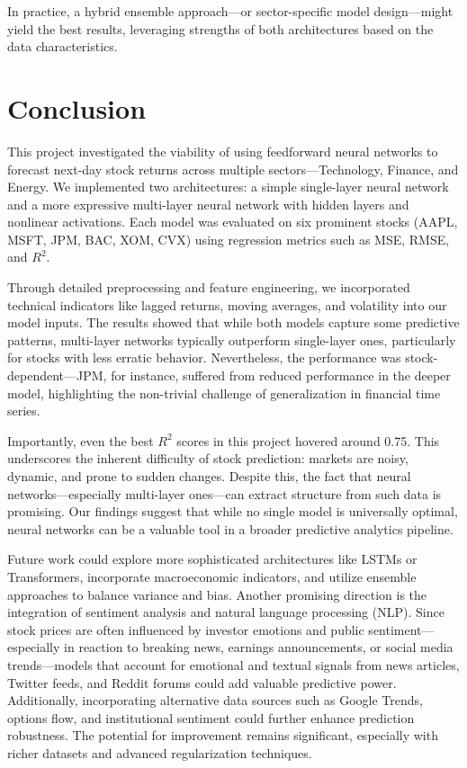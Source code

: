 \documentclass[12pt]{article}
\begin{document}
In practice, a hybrid ensemble approach—or sector-specific model design—might yield the best results, leveraging strengths of both architectures based on the data characteristics.

\section{Conclusion}

This project investigated the viability of using feedforward neural networks to forecast next-day stock returns across multiple sectors—Technology, Finance, and Energy. We implemented two architectures: a simple single-layer neural network and a more expressive multi-layer neural network with hidden layers and nonlinear activations. Each model was evaluated on six prominent stocks (AAPL, MSFT, JPM, BAC, XOM, CVX) using regression metrics such as MSE, RMSE, and $R^2$.

Through detailed preprocessing and feature engineering, we incorporated technical indicators like lagged returns, moving averages, and volatility into our model inputs. The results showed that while both models capture some predictive patterns, multi-layer networks typically outperform single-layer ones, particularly for stocks with less erratic behavior. Nevertheless, the performance was stock-dependent—JPM, for instance, suffered from reduced performance in the deeper model, highlighting the non-trivial challenge of generalization in financial time series.

Importantly, even the best $R^2$ scores in this project hovered around 0.75. This underscores the inherent difficulty of stock prediction: markets are noisy, dynamic, and prone to sudden changes. Despite this, the fact that neural networks—especially multi-layer ones—can extract structure from such data is promising. Our findings suggest that while no single model is universally optimal, neural networks can be a valuable tool in a broader predictive analytics pipeline.

Future work could explore more sophisticated architectures like LSTMs or Transformers, incorporate macroeconomic indicators, and utilize ensemble approaches to balance variance and bias. Another promising direction is the integration of sentiment analysis and natural language processing (NLP). Since stock prices are often influenced by investor emotions and public sentiment—especially in reaction to breaking news, earnings announcements, or social media trends—models that account for emotional and textual signals from news articles, Twitter feeds, and Reddit forums could add valuable predictive power. Additionally, incorporating alternative data sources such as Google Trends, options flow, and institutional sentiment could further enhance prediction robustness. The potential for improvement remains significant, especially with richer datasets and advanced regularization techniques.
\end{document}
